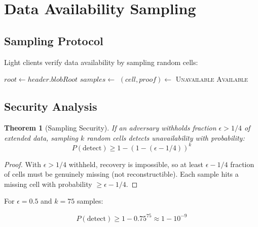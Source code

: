 \documentclass[11pt,a4paper]{article}
\newtheorem{theorem}{Theorem}
\begin{document}
\section{Data Availability Sampling}

\subsection{Sampling Protocol}

Light clients verify data availability by sampling random cells:

\begin{algorithm}
\caption{Data Availability Sampling}
\begin{algorithmic}[1]
    \State $root \gets header.blobRoot$
    \State $samples \gets$ 
        \State $(cell, proof) \gets$ 
            \State \Return \textsc{Unavailable}
        \EndIf
    \EndFor
    \State \Return \textsc{Available}
\EndProcedure
\end{algorithmic}
\end{algorithm}

\subsection{Security Analysis}

\begin{theorem}[Sampling Security]
If an adversary withholds fraction $\epsilon > 1/4$ of extended data, sampling $k$ random cells detects unavailability with probability:
\begin{equation}
    P(\text{detect}) \geq 1 - (1 - (\epsilon - 1/4))^k
\end{equation}
\end{theorem}

\begin{proof}
With $\epsilon > 1/4$ withheld, recovery is impossible, so at least $\epsilon - 1/4$ fraction of cells must be genuinely missing (not reconstructible). Each sample hits a missing cell with probability $\geq \epsilon - 1/4$.
\end{proof}

For $\epsilon = 0.5$ and $k = 75$ samples:

\begin{equation}
    P(\text{detect}) \geq 1 - 0.75^{75} \approx 1 - 10^{-9}
\end{equation}
\end{document}
